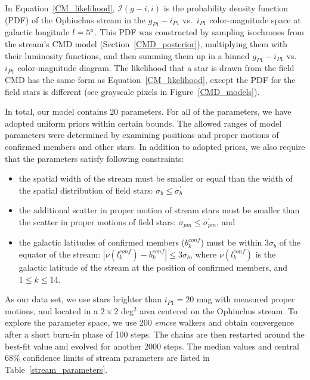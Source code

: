 \documentclass[iop]{emulateapj}
\begin{document}
In Equation~\ref{CM_likelihood}, $\mathcal{I}(g-i, i)$ is the probability
density function (PDF) of the Ophiuchus stream in the $g_{P1}-i_{P1}$
vs.~$i_{P1}$ color-magnitude space at galactic longitude $l=5\mbox{$^\circ$}$. This PDF
was constructed by sampling isochrones from the stream's CMD model
(Section~\ref{CMD_posterior}), multiplying them with their luminosity functions,
and then summing them up in a binned $g_{P1}-i_{P1}$ vs.~$i_{P1}$
color-magnitude diagram. The likelihood that a star is drawn from the field CMD
has the same form as Equation~\ref{CM_likelihood}, except the PDF for the field
stars is different (see grayscale pixels in Figure~\ref{CMD_models}).

In total, our model contains 20 parameters. For all of the parameters, we have
adopted uniform priors within certain bounds. The allowed ranges of model
parameters were determined by examining positions and proper motions of
confirmed members and other stars. In addition to adopted priors, we also
require that the parameters satisfy following constraints:
\begin{itemize}
\item the spatial width of the stream must be smaller or equal than the width of
the spatial distribution of field stars: $\sigma_b \leq \sigma^\prime_b$
\item the additional scatter in proper motion of stream stars must be smaller
than the scatter in proper motions of field stars:
$\sigma_{pm} \leq \sigma^\prime_{pm}$, and
\item the galactic latitudes of confirmed members ($b^{conf}_k$) must be within
$3\sigma_b$ of the equator of the stream:
$|\nu(l^{conf}_k) - b^{conf}_k| \leq 3\sigma_b$,
where $\nu(l^{conf}_k)$ is the galactic latitude of the stream at the position
of confirmed members, and $1 \leq k \leq 14$.
\end{itemize}

As our data set, we use stars brighter than $i_{P1}=20$ mag with measured proper
motions, and located in a $2\times2$ deg$^2$ area centered on the Ophiuchus
stream. To explore the parameter space, we use 200 {\em emcee} walkers and
obtain convergence after a short burn-in phase of 100 steps. The chains are then
restarted around the best-fit value and evolved for another 2000 steps. The
median values and central $68\%$ confidence limits of stream parameters are
listed in Table~\ref{stream_parameters}.
\end{document}
